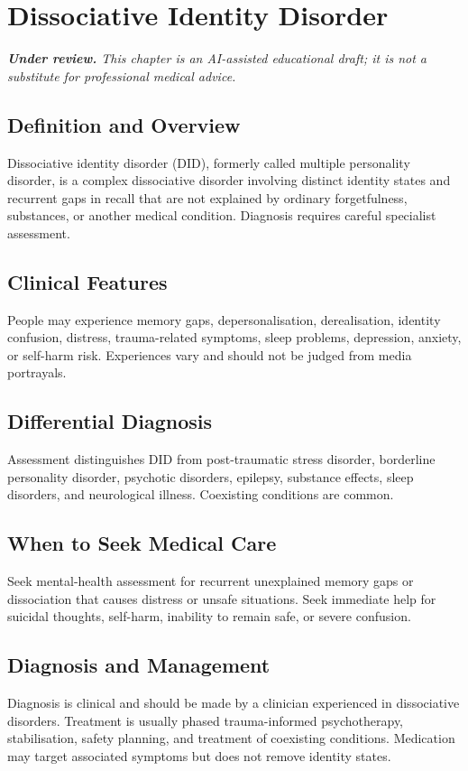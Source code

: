 \chapter{Dissociative Identity Disorder}

\medskip
\noindent\textit{\textbf{Under review.} This chapter is an AI-assisted educational draft; it is not a substitute for professional medical advice.}

\section*{Definition and Overview}
Dissociative identity disorder (DID), formerly called multiple personality disorder, is a complex dissociative disorder involving distinct identity states and recurrent gaps in recall that are not explained by ordinary forgetfulness, substances, or another medical condition. Diagnosis requires careful specialist assessment.

\section*{Clinical Features}
People may experience memory gaps, depersonalisation, derealisation, identity confusion, distress, trauma-related symptoms, sleep problems, depression, anxiety, or self-harm risk. Experiences vary and should not be judged from media portrayals.

\section*{Differential Diagnosis}
Assessment distinguishes DID from post-traumatic stress disorder, borderline personality disorder, psychotic disorders, epilepsy, substance effects, sleep disorders, and neurological illness. Coexisting conditions are common.

\section*{When to Seek Medical Care}
Seek mental-health assessment for recurrent unexplained memory gaps or dissociation that causes distress or unsafe situations. Seek immediate help for suicidal thoughts, self-harm, inability to remain safe, or severe confusion.

\section*{Diagnosis and Management}
Diagnosis is clinical and should be made by a clinician experienced in dissociative disorders. Treatment is usually phased trauma-informed psychotherapy, stabilisation, safety planning, and treatment of coexisting conditions. Medication may target associated symptoms but does not remove identity states.

